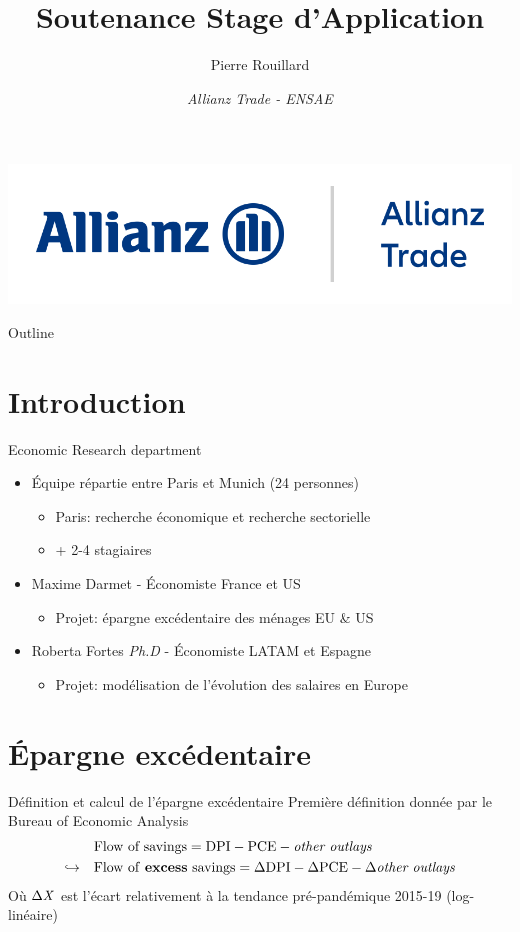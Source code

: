 \documentclass[9pt, xcolor={dvipsnames}]{beamer}
\author{Pierre Rouillard}
\title{Soutenance Stage d'Application}
\institute{xx/xx/xxxx \\ Maître de stage: Françoise Huang}
\date{\textit{Allianz Trade - ENSAE}}
\begin{document}
\begin{frame}[plain]
\titlepage
\centering
\includegraphics[width=.5\textwidth]{Allianz_Trade.png}
\end{frame}

\begin{frame}{Outline}
  \tableofcontents
\end{frame}

\section{Introduction}
\begin{frame}[label=intro]{Economic Research department}
\begin{itemize}
\item Équipe répartie entre Paris et Munich (24 personnes)\\
   \begin{itemize}
    \item Paris: recherche économique et recherche sectorielle
    \item + 2-4 stagiaires
   \end{itemize}
\item Maxime Darmet - Économiste France et US
  \begin{itemize}
    \item Projet: épargne excédentaire des ménages EU \& US
  \end{itemize}
\item Roberta Fortes \textit{Ph.D} - Économiste LATAM et Espagne
  \begin{itemize}
    \item Projet: modélisation de l'évolution des salaires en Europe
  \end{itemize}
\end{itemize}
\end{frame}

\section{Épargne excédentaire}
\begin{frame}{Définition et calcul de l'épargne excédentaire}
  Première définition donnée par le Bureau of Economic Analysis
  \begin{align*}
    &\textrm{Flow of savings} = \textrm{DPI} - \textrm{PCE} - \textrm{\textit{other outlays}} \\
    \hookrightarrow \quad &\textrm{Flow of \textbf{excess} savings} = \Delta \textrm{DPI} - \Delta \textrm{PCE} - \Delta \textrm{\textit{other outlays}}
  \end{align*}
  Où $\Delta \textrm{\textit{X}}$ est l'écart relativement à la tendance pré-pandémique 2015-19 (log-linéaire)
  
\end{frame}
\end{document}
